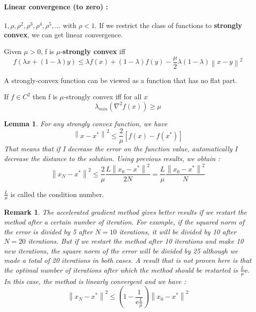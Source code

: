 \documentclass[a4paper]{article}
\begin{document}
\paragraph{Linear convergence (to zero) :} $1, \rho, \rho ^2, \rho ^3, \rho ^4, \rho ^5, ... $ with $\rho < 1$. If we restrict the class of functions to \textbf{strongly convex}, we can get linear convergence.

\begin{def1}
Given $\mu>0$, f is $\mu$-\textbf{strongly convex} iff
\begin{equation*}
f(\lambda x + (1-\lambda)y)\leq \lambda f(x) + (1-\lambda)f(y) - \frac{\mu}{2}\lambda (1-\lambda)\left\|x - y\right\|^2
\end{equation*}
\end{def1}
\noindent A strongly-convex function can be viewed as a function that has no flat part.

\begin{prop1}
If $f \in C^2$ then f is $\mu$-strongly convex iff for all $x$ 
\[
    \lambda_{min}(\nabla^2f(x))\ge \mu
\]
\end{prop1}

\newtheorem{lem1}{Lemma} 
\begin{lem1}
For any strongly convex function, we have
\begin{equation*}
\left\|x - x^*\right\|^2 \leq \frac{2}{\mu}[f(x) - f(x^*)]
\end{equation*}
That means that if I decrease the error on the function value, automatically I decrease the distance to the solution. Using previous results, we obtain :
\begin{equation*}
\left\|x_N - x^*\right\|^2 \leq \frac{2}{\mu}\frac{L\left\|x_0 - x^*\right\|^2}{2N} = \frac{L}{\mu}\frac{\left\|x_0 - x^*\right\|^2}{N}
\end{equation*}
\end{lem1}
\noindent $\frac{L}{\mu}$ is called the condition number.

\newtheorem{rem}{Remark}
\begin{rem}
The accelerated gradient method gives better results if we restart the method after a certain number of iteration. For example, if the squared norm of the error is divided by 5 after $N = 10$ iterations, it will be divided by 10 after $N = 20$ iterations. But if we restart the method after 10 iterations and make 10 new iterations, the square norm of the error will be divided by 25 although we made a total of 20 iterations in both cases. A result that is not proven here is that the optimal number of iterations after which the method should be restarted is $\frac{L}{\mu}\text{e}$. In this case, the method is linearly convergent and we have :
\[
    \left\|x_N - x^*\right\|^2 \leq \left(1-\frac{1}{\text{e}\frac{L}{\mu}}\right)\left\|x_0 - x^*\right\|^2
\]
\end{rem}
\end{document}
